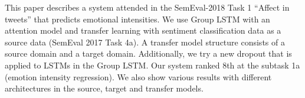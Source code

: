 This paper describes a system attended in the SemEval-2018 Task 1 ``Affect in tweets'' that predicts emotional intensities. We use Group LSTM with an attention model and transfer learning with sentiment classification data as a source data (SemEval 2017 Task 4a). A transfer model structure consists of a source domain and a target domain. Additionally, we try a new dropout that is applied to LSTMs in the Group LSTM. Our system ranked 8th at the subtask 1a (emotion intensity regression). We also show various results with different architectures in the source, target and transfer models.
